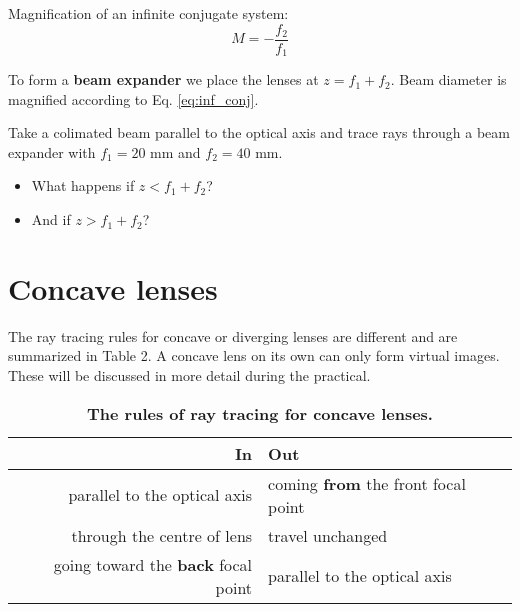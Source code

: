 \documentclass[a4paper]{report}
\newcommand{\nexercise}[0]{\arabic{exercises}\addtocounter{exercises}{1}}
\begin{document}
Magnification of an infinite conjugate system:
\begin{equation}
\label{eq:inf_conj}
	M = - \frac{f_2}{f_1}
\end{equation} 

To form a \textbf{beam expander} we place the lenses at $z = f_1 + f_2$. Beam diameter is magnified according to Eq. \ref{eq:inf_conj}.

\begin{exercisebox}[frametitle={Exercise \nexercise: Beam expander}]
Take a colimated beam parallel to the optical axis and trace rays through a beam expander with $f_1=20$ mm and $f_2=40$ mm.
\begin{itemize}
	\item What happens if $z < f_1 + f_2$?
	\item And if $z > f_1 + f_2$?
\end{itemize}
\end{exercisebox}

\section{Concave lenses}
The ray tracing rules for concave or diverging lenses are different and are summarized in Table 2. A concave lens on its own can only form virtual images. These will be discussed in more detail during the practical.

\begin{table}[b]
\centering
\begin{tabularx}{.7\textwidth}{r | l}
\toprule
\textbf{In} & \textbf{Out}
\\ \midrule
parallel to the optical axis & coming \textbf{from} the front focal point \\
through the centre of lens & travel unchanged \\
going toward the \textbf{back} focal point & parallel to the optical axis \\
\bottomrule
\end{tabularx}
\label{tbl:concave}
\caption{
{\bf The rules of ray tracing for concave lenses.}}
\end{table}
\end{document}
